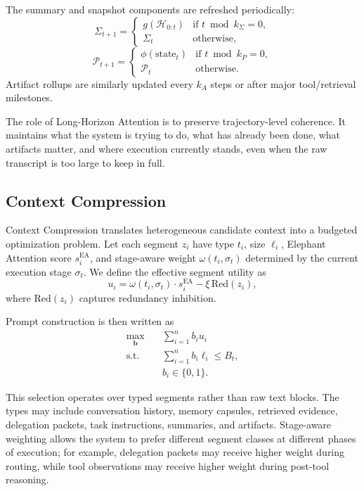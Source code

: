 \documentclass[a4paper,fleqn]{cas-sc}
\begin{document}
The summary and snapshot components are refreshed periodically:
\begin{equation}
\Sigma_{t+1} =
\begin{cases}
g(\mathcal{H}_{0:t}) & \text{if } t \bmod k_{\Sigma} = 0, \\
\Sigma_t & \text{otherwise,}
\end{cases}
\end{equation}
\begin{equation}
\mathcal{P}_{t+1} =
\begin{cases}
\phi(\text{state}_t) & \text{if } t \bmod k_{P} = 0, \\
\mathcal{P}_t & \text{otherwise.}
\end{cases}
\end{equation}
Artifact rollups are similarly updated every $k_A$ steps or after major tool/retrieval milestones.

The role of Long-Horizon Attention is to preserve trajectory-level coherence. It maintains what the system is trying to do, what has already been done, what artifacts matter, and where execution currently stands, even when the raw transcript is too large to keep in full.

\subsection{Context Compression}

Context Compression translates heterogeneous candidate context into a budgeted optimization problem. Let each segment $z_i$ have type $t_i$, size $\ell_i$, Elephant Attention score $s_i^{\text{EA}}$, and stage-aware weight $\omega(t_i, \sigma_t)$ determined by the current execution stage $\sigma_t$. We define the effective segment utility as
\begin{equation}
u_i = \omega(t_i, \sigma_t) \cdot s_i^{\text{EA}} - \xi \, \mathrm{Red}(z_i),
\end{equation}
where $\mathrm{Red}(z_i)$ captures redundancy inhibition.

Prompt construction is then written as
\begin{align}
\max_{\bm{b}} \quad & \sum_{i=1}^{n} b_i u_i \\
\text{s.t.} \quad & \sum_{i=1}^{n} b_i \ell_i \leq B_t, \\
& b_i \in \{0,1\}.
\end{align}

This selection operates over typed segments rather than raw text blocks. The types may include conversation history, memory capsules, retrieved evidence, delegation packets, task instructions, summaries, and artifacts. Stage-aware weighting allows the system to prefer different segment classes at different phases of execution; for example, delegation packets may receive higher weight during routing, while tool observations may receive higher weight during post-tool reasoning.
\end{document}

